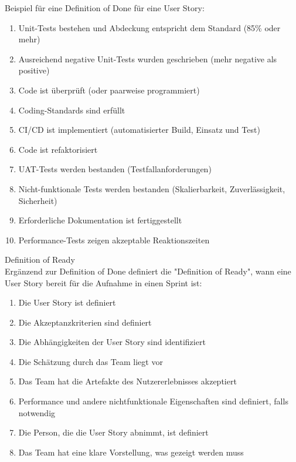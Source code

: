 \begin{example}
    Beispiel für eine Definition of Done für eine User Story:
    \begin{enumerate}
        \item Unit-Tests bestehen und Abdeckung entspricht dem Standard (85\% oder mehr)
        \item Ausreichend negative Unit-Tests wurden geschrieben (mehr negative als positive)
        \item Code ist überprüft (oder paarweise programmiert)
        \item Coding-Standards sind erfüllt
        \item CI/CD ist implementiert (automatisierter Build, Einsatz und Test)
        \item Code ist refaktorisiert
        \item UAT-Tests werden bestanden (Testfallanforderungen)
        \item Nicht-funktionale Tests werden bestanden (Skalierbarkeit, Zuverlässigkeit, Sicherheit)
        \item Erforderliche Dokumentation ist fertiggestellt
        \item Performance-Tests zeigen akzeptable Reaktionszeiten
    \end{enumerate}
\end{example}

\begin{definition}{Definition of Ready}\\
    Ergänzend zur Definition of Done definiert die "Definition of Ready", wann eine User Story bereit für die Aufnahme in einen Sprint ist:
    \begin{enumerate}
        \item Die User Story ist definiert
        \item Die Akzeptanzkriterien sind definiert
        \item Die Abhängigkeiten der User Story sind identifiziert
        \item Die Schätzung durch das Team liegt vor
        \item Das Team hat die Artefakte des Nutzererlebnisses akzeptiert
        \item Performance und andere nichtfunktionale Eigenschaften sind definiert, falls notwendig
        \item Die Person, die die User Story abnimmt, ist definiert
        \item Das Team hat eine klare Vorstellung, was gezeigt werden muss
    \end{enumerate}
\end{definition}

